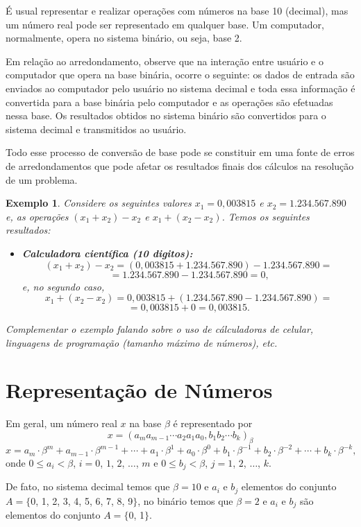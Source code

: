 \documentclass[12pt,a4paper]{book}
\newtheorem{example}{Exemplo}
\newcommand{\todo}[1]{
	{\color{red}#1}
}
\begin{document}
É usual representar e realizar operações com números na base 10 (decimal), mas um número real pode ser representado em qualquer base. Um computador, normalmente, opera no sistema binário, ou seja, base 2.

Em relação ao arredondamento, observe que na interação entre usuário e o computador que opera na base binária, ocorre o seguinte: os dados de entrada são enviados ao computador pelo usuário no sistema decimal e toda essa informação é convertida para a base binária pelo computador e as operações são efetuadas nessa base. Os resultados obtidos no sistema binário são convertidos para o sistema decimal e transmitidos ao usuário.

Todo esse processo de conversão de base pode se constituir em uma fonte de erros de arredondamentos que pode afetar os resultados finais dos cálculos na resolução de um problema.

\begin{example}
	Considere os seguintes valores $x_1=0,003815$ e $x_2=1.234.567.890$ e, as operações $(x_1+x_2)-x_2$ e $x_1+(x_2-x_2)$. Temos os seguintes resultados:

	\begin{itemize}
		\item \textbf{Calculadora científica (10 digitos):}\hfill
		$$(x_1+x_2)-x_2=(0,003815+1.234.567.890)-1.234.567.890=$$
		$$=1.234.567.890-1.234.567.890=0\text{,}$$
		e, no segundo caso,
		$$x_1+(x_2-x_2)=0,003815+(1.234.567.890-1.234.567.890)=$$
		$$=0,003815+0=0,003815\text{.}$$
	\end{itemize}
	\todo{Complementar o exemplo falando sobre o uso de cálculadoras de celular, linguagens de programação (tamanho máximo de números), etc.}
\end{example}

\chapter{Representação de Números}

Em geral, um número real $x$ na base $\beta$ é representado por
$$
	x=(a_{m}a_{m-1}\cdots a_2 a_1 a_0, b_1 b_2\cdots b_k)_{\beta}
$$
$$
	x=a_{m}\cdot \beta^{m}
	+
	a_{m-1} \cdot \beta^{m-1}
	+ \cdots +
	a_1 \cdot \beta^1
	+
	a_0 \cdot \beta^0
	+
	b_1 \cdot \beta^{-1}
	+
	b_2 \cdot \beta^{-2}
	+ \cdots +
	b_k \cdot \beta^{-k}
	\text{,}
$$
onde $0\leqslant a_i < \beta$, $i=0$, $1$, $2$, $\dots$, $m$ e $0\leqslant b_j < \beta$, $j=1$, $2$, $\dots$, $k$.

De fato, no sistema decimal temos que $\beta=10$ e $a_i$ e $b_j$ elementos do conjunto $A=\{$0, 1, 2, 3, 4, 5, 6, 7, 8, 9$\}$, no binário temos que $\beta=2$ e $a_i$ e $b_j$ são elementos do conjunto $A=\{$0, 1$\}$.
\end{document}
